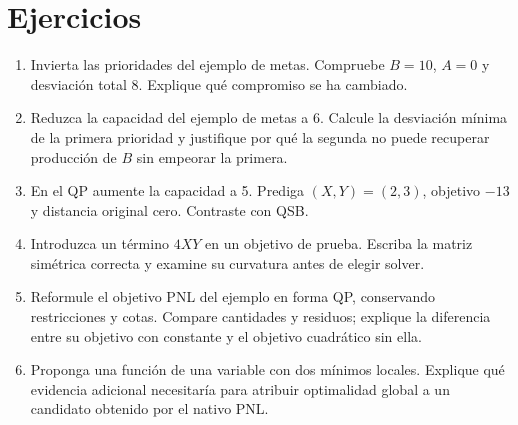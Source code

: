 \section{Ejercicios}
\begin{enumerate}
 \item Invierta las prioridades del ejemplo de metas. Compruebe \(B=10\),
 \(A=0\) y desviación total 8. Explique qué compromiso se ha cambiado.
 \item Reduzca la capacidad del ejemplo de metas a 6. Calcule la desviación
 mínima de la primera prioridad y justifique por qué la segunda no puede
 recuperar producción de \(B\) sin empeorar la primera.
 \item En el QP aumente la capacidad a 5. Prediga \((X,Y)=(2,3)\),
 objetivo \(-13\) y distancia original cero. Contraste con QSB.
 \item Introduzca un término \(4XY\) en un objetivo de prueba. Escriba
 la matriz simétrica correcta y examine su curvatura antes de elegir solver.
 \item Reformule el objetivo PNL del ejemplo en forma QP, conservando
 restricciones y cotas. Compare cantidades y residuos; explique la diferencia
 entre su objetivo con constante y el objetivo cuadrático sin ella.
 \item Proponga una función de una variable con dos mínimos locales.
 Explique qué evidencia adicional necesitaría para atribuir optimalidad global
 a un candidato obtenido por el nativo PNL.
\end{enumerate}
